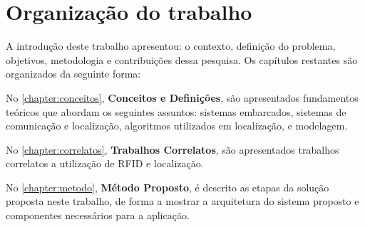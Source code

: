\begin{comment}
\section{Metodologia Proposta}

\section{Contribuições propostas}
As contribuições propostas deste trabalho são:
\begin{enumerate}
    \item A implementação de um sistema para localização de objetos. O Método utilizado visa localizar objeto sem alta precisão, porém é viável para controle de acervos.
    \item O sistema desenvolvido pode auxiliar no controle e ainda facilitar o levantamento de todos os bens do proprietário.
\end{enumerate}

\end{comment}


\section{Organização do trabalho}
A introdução deste trabalho apresentou: o contexto, definição do problema, objetivos, metodologia e contribuições
dessa pesquisa. Os capítulos restantes são organizados da seguinte forma:

No \autoref{chapter:conceitos}, \textbf{Conceitos e Definições}, são apresentados fundamentos teóricos que abordam os
seguintes assuntos: sistemas embarcados, sistemas de comunicação e localização, algoritmos utilizados em localização, e modelagem.

\par
No \autoref{chapter:correlatos}, \textbf{Trabalhos Correlatos}, são apresentados trabalhos correlatos a utilização de RFID e localização.

\par
No \autoref{chapter:metodo}, \textbf{Método Proposto}, é descrito as etapas da solução proposta neste trabalho, de
forma a mostrar a arquitetura do sistema proposto e componentes necessários para a aplicação.


